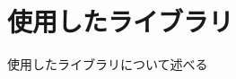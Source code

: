 \documentclass[main]{subfiles}
\begin{document}
\chapter{使用したライブラリ}
\label{cha:library}

使用したライブラリについて述べる
\end{document}
